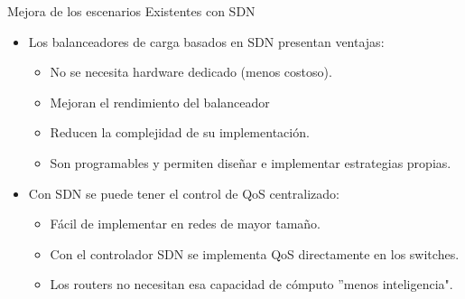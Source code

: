 \documentclass[10pt,spanish,xcolor={svgnames}]{beamer}
\begin{document}
\begin{frame}{Mejora de los escenarios Existentes con SDN}
\begin{alertblock}{\LARGE}
\begin{itemize}
	\item Los balanceadores de carga basados en SDN presentan ventajas:
	\begin{itemize}
    	\item  No se necesita hardware dedicado (menos costoso).
    	\item  Mejoran el rendimiento del balanceador
		\item  Reducen la complejidad de su implementación.
        \item Son programables y permiten diseñar e implementar estrategias propias.
	\end{itemize}
    \vspace{1em}
  	\item Con SDN se puede tener el control de QoS centralizado:
    \begin{itemize}
    	\item  Fácil de implementar en redes de mayor tamaño.
    	\item  Con el controlador SDN se implementa QoS directamente en los switches.
    	\item  Los routers no necesitan esa capacidad de cómputo ''menos inteligencia".
    \end{itemize}
\end{itemize}
\end{alertblock}
\end{frame}
\end{document}
